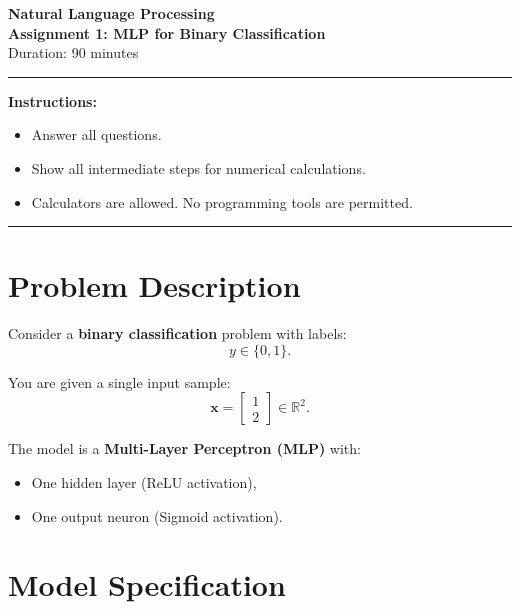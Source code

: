 \documentclass[12pt,a4paper]{article}
\begin{document}
\begin{center}
  {\Large\bfseries Natural Language Processing}\\[0.4em]
  {\large\bfseries Assignment 1: MLP for Binary Classification}\\[0.3em]
  {\normalsize Duration: 90 minutes}
\end{center}

\noindent\rule{\linewidth}{0.6pt}

\vspace{0.3em}
\textbf{Instructions:}
\begin{itemize}[topsep=2pt, itemsep=2pt]
  \item Answer all questions.
  \item Show all intermediate steps for numerical calculations.
  \item Calculators are allowed. No programming tools are permitted.
\end{itemize}

\noindent\rule{\linewidth}{0.6pt}
\vspace{0.5em}

\section*{Problem Description}

Consider a \textbf{binary classification} problem with labels:
\[
  y \in \{0, 1\}.
\]

You are given a single input sample:
\[
  \mathbf{x} = \begin{bmatrix} 1 \\ 2 \end{bmatrix} \in \mathbb{R}^2.
\]

The model is a \textbf{Multi-Layer Perceptron (MLP)} with:
\begin{itemize}[topsep=2pt, itemsep=2pt]
  \item One hidden layer (ReLU activation),
  \item One output neuron (Sigmoid activation).
\end{itemize}

\section*{Model Specification}
\end{document}
